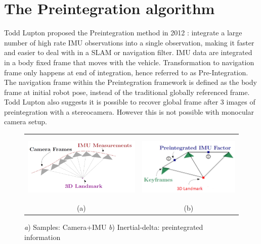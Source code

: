\documentclass[12pt]{article}   %
\begin{document}
\section{The Preintegration algorithm}

Todd Lupton proposed the Preintegration method in 2012 \cite{Lupton2012}: integrate a large number of high rate IMU observations into a single observation, making it faster and easier to deal with in a SLAM or navigation filter. IMU data are integrated in a body fixed frame that moves with the vehicle. Transformation to navigation frame only happens at end of integration, hence referred to as Pre-Integration. \\
The navigation frame within the Preintegration framework is defined as the body frame at initial robot pose, instead of the traditional globally referenced frame. Todd Lupton also suggests it is possible to recover global frame after 3 images of preintegration with a stereocamera. However this is not possible with monocular camera setup.
\begin{figure}[!ht]
	\begin{center}\begin{tabular}{cc}
			\includegraphics[height=3.3cm]{figures/IMU-sample_Image-frames_3D_illustration.png}&
			\includegraphics[height=3.3cm]{Figures/Preintegrated-IMU_image_3D_illustration.png}\\
			(a) & (b) \\
		\end{tabular}\end{center}
		\caption{\emph{a}) Samples: Camera+IMU \emph{b}) Inertial-delta: preintegrated information \cite{Manifold2015}} 
		\label{fig:VIN sensor information}
	\end{figure} 
\end{document}
